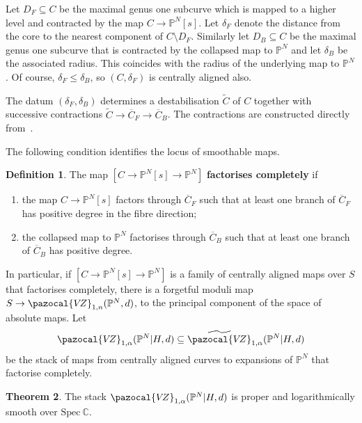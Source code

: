 \documentclass[11pt]{amsart}
\newcommand{\PP}{\mathbb P}
\newcommand{\VZ}{\pazocal{V\!Z}}
\renewcommand{\to}{\rightarrow}
\theoremstyle{definition}
\newtheorem{thm}{Theorem}[section]
\theoremstyle{definition}
\newtheorem{definition}[thm]{Definition}
\begin{document}
Let $D_F\subseteq C$ be the maximal genus one subcurve which is mapped to a higher level and contracted by the map $C\to \mathbb P^N[s]$. Let $\delta_F$ denote the distance from the core to the nearest component of $C \setminus D_F$. Similarly let $D_B\subseteq C$ be the maximal genus one subcurve that is contracted by the collapsed map to $\mathbb P^N$ and let $\delta_B$ be the associated radius. This coincides with the radius of the underlying map to $\mathbb P^N$. Of course, $\delta_F\leq \delta_B$, so $(C,\delta_F)$ is centrally aligned also.

The datum $(\delta_F,\delta_B)$ determines a destabilisation $\widetilde C$ of $C$ together with successive contractions $\widetilde C\to \overline C_F\to\overline C_B$. The contractions are constructed directly from~\cite[Section~3]{RSPW}.

The following condition identifies the locus of smoothable maps. 

\begin{definition}
The map $[C\to \mathbb P^N[s]\to \mathbb P^N]$ \textbf{factorises completely} if
\begin{enumerate}
\item the map $C\to \mathbb P^N[s]$ factors through $\overline C_F$ such that at least one branch of $\overline C_F$ has positive degree in the fibre direction; 
\item the collapsed map to $\mathbb P^N$ factorises through $\overline C_B$ such that at least one branch of $\overline C_B$ has positive degree.
\end{enumerate}
\end{definition}

In particular, if $[C\to \mathbb P^N[s]\to \mathbb P^N]$ is a family of centrally aligned maps over $S$ that factorises completely, there is a forgetful moduli map $S\to \VZ_{1,n}(\mathbb P^N,d)$, to the principal component of the space of absolute maps. Let
\begin{equation*} \VZ_{1,\alpha}(\mathbb P^N|H,d) \subseteq \widetilde\VZ_{1,\alpha}(\PP^N|H,d) \end{equation*}
be the stack of maps from centrally aligned curves to expansions of $\mathbb P^N$ that factorise completely.

\begin{thm}\label{thm: log-smoothness}
The stack $\VZ_{1,\alpha}(\mathbb P^N|H,d)$ is proper and logarithmically smooth over $\mathrm{Spec} \ \mathbb C$. 
\end{thm}
\end{document}

